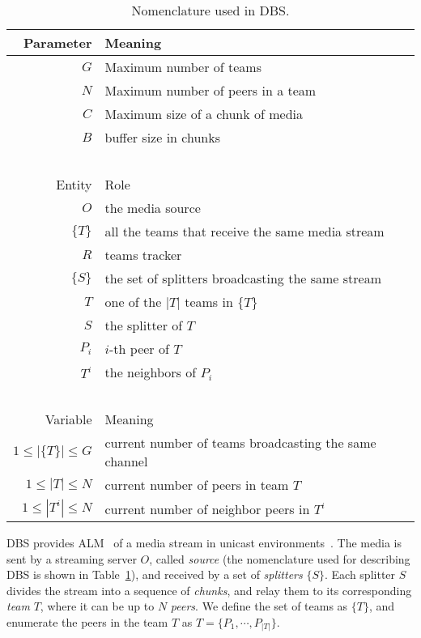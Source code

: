 \label{sec:DBS}

\begin{table}
  \begin{tabular}{rl}
    Parameter & Meaning \\
    \hline
    $G$       & Maximum number of teams \\
    $N$       & Maximum number of peers in a team \\
    $C$       & Maximum size of a chunk of media \\
    $B$       & buffer size in chunks \\
    ~\\
    Entity  & Role \\
    \hline
    $O$     & the media source \\
    $\{T\}$ & all the teams that receive the same media stream \\
    $R$     & teams tracker \\
    $\{S\}$ & the set of splitters broadcasting the same stream \\
    $T$     & one of the $|T|$ teams in $\{T\}$ \\
    $S$     & the splitter of $T$ \\
    $P_i$   & $i$-th peer of $T$ \\
    $T^i$   & the neighbors of $P_i$ \\
    ~\\
    Variable            & Meaning \\
    \hline
    $1\leq |\{T\}|\leq G$ & current number of teams broadcasting the same channel \\
    $1\leq |T|\leq N$     & current number of peers in team $T$ \\
    $1\leq |T^i|\leq N$   & current number of neighbor peers in $T^i$ \\
  \end{tabular}
  \caption{Nomenclature used in DBS.\label{tab:DBS_nomenclature}}
\end{table}

DBS provides ALM~\cite{banerjee2002scalable} of a media stream in
unicast environments~\cite{comer2003computer}. The media is sent by a
streaming server $O$, called \emph{source} (the nomenclature used for
describing DBS is shown in Table~\ref{tab:DBS_nomenclature}), and
received by a set of \emph{splitters} $\{S\}$.
Each splitter $S$ divides the stream into a sequence of
\emph{chunks}, and relay them to its corresponding \emph{team} $T$,
where it can be up to $N$ \emph{peers}. We define the set of teams as
$\{T\}$,
and enumerate the peers in the team $T$ as $T=\{P_1,\cdots,P_{|T|}\}$.

